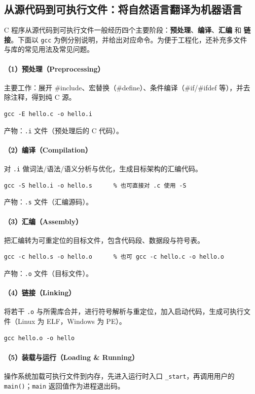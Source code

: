\subsection{从源代码到可执行文件：将自然语言翻译为机器语言}

C 程序从源代码到可执行文件一般经历四个主要阶段：\textbf{预处理}、\textbf{编译}、\textbf{汇编} 和 \textbf{链接}。下面以 \texttt{gcc} 为例分别说明，并给出对应命令。为便于工程化，还补充多文件与库的常见用法及常见问题。

\paragraph{（1）预处理（Preprocessing）}
主要工作：展开 \#include、宏替换（\#define）、条件编译（\#if/\#ifdef 等），并去除注释，得到纯 C 源。
\begin{verbatim}
gcc -E hello.c -o hello.i
\end{verbatim}
产物：\texttt{.i} 文件（预处理后的 C 代码）。

\paragraph{（2）编译（Compilation）}
对 \texttt{.i} 做词法/语法/语义分析与优化，生成目标架构的汇编代码。
\begin{verbatim}
gcc -S hello.i -o hello.s      % 也可直接对 .c 使用 -S
\end{verbatim}
产物：\texttt{.s} 文件（汇编源码）。

\paragraph{（3）汇编（Assembly）}
把汇编转为可重定位的目标文件，包含代码段、数据段与符号表。
\begin{verbatim}
gcc -c hello.s -o hello.o      % 也可 gcc -c hello.c -o hello.o
\end{verbatim}
产物：\texttt{.o} 文件（目标文件）。

\paragraph{（4）链接（Linking）}
将若干 \texttt{.o} 与所需库合并，进行符号解析与重定位，加入启动代码，生成可执行文件（Linux 为 ELF，Windows 为 PE）。
\begin{verbatim}
gcc hello.o -o hello
\end{verbatim}

\paragraph{（5）装载与运行（Loading \& Running）}
操作系统加载可执行文件到内存，先进入运行时入口 \texttt{\_start}，再调用用户的 \texttt{main()}；\texttt{main} 返回值作为进程退出码。


